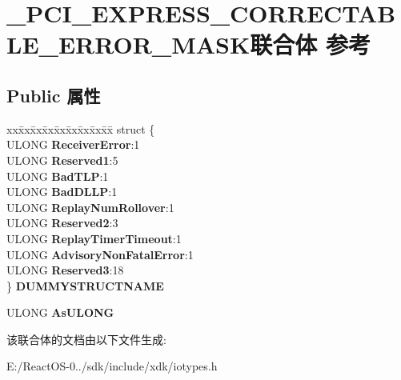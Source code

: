 \hypertarget{union___p_c_i___e_x_p_r_e_s_s___c_o_r_r_e_c_t_a_b_l_e___e_r_r_o_r___m_a_s_k}{}\section{\+\_\+\+P\+C\+I\+\_\+\+E\+X\+P\+R\+E\+S\+S\+\_\+\+C\+O\+R\+R\+E\+C\+T\+A\+B\+L\+E\+\_\+\+E\+R\+R\+O\+R\+\_\+\+M\+A\+S\+K联合体 参考}
\label{union___p_c_i___e_x_p_r_e_s_s___c_o_r_r_e_c_t_a_b_l_e___e_r_r_o_r___m_a_s_k}
\subsection*{Public 属性}
\begin{DoxyCompactItemize}
\item 
\mbox{\label{union___p_c_i___e_x_p_r_e_s_s___c_o_r_r_e_c_t_a_b_l_e___e_r_r_o_r___m_a_s_k_a048aea482da6c4ec96c3ee37b513d44e}} 
\begin{tabbing}
xx\=xx\=xx\=xx\=xx\=xx\=xx\=xx\=xx\=\kill
struct \{\\
\>ULONG {\bfseries ReceiverError}:1\\
\>ULONG {\bfseries Reserved1}:5\\
\>ULONG {\bfseries BadTLP}:1\\
\>ULONG {\bfseries BadDLLP}:1\\
\>ULONG {\bfseries ReplayNumRollover}:1\\
\>ULONG {\bfseries Reserved2}:3\\
\>ULONG {\bfseries ReplayTimerTimeout}:1\\
\>ULONG {\bfseries AdvisoryNonFatalError}:1\\
\>ULONG {\bfseries Reserved3}:18\\
\} {\bfseries DUMMYSTRUCTNAME}\\

\end{tabbing}\item 
\mbox{\label{union___p_c_i___e_x_p_r_e_s_s___c_o_r_r_e_c_t_a_b_l_e___e_r_r_o_r___m_a_s_k_a369a89bae10e43b0cd4217408222e388}} 
U\+L\+O\+NG {\bfseries As\+U\+L\+O\+NG}
\end{DoxyCompactItemize}


该联合体的文档由以下文件生成\+:\begin{DoxyCompactItemize}
\item 
E\+:/\+React\+O\+S-\/0../sdk/include/xdk/iotypes.\+h\end{DoxyCompactItemize}

